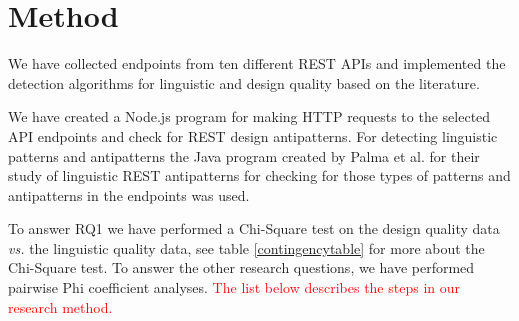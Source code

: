 \section{Method}\label{sec:Method}

We have collected endpoints from ten different REST APIs and implemented the detection algorithms for linguistic and design quality based on the literature. 

We have created a Node.js program for making HTTP requests to the selected API endpoints and check for REST design antipatterns. For detecting linguistic patterns and antipatterns the Java program created by Palma et al. for their study of linguistic REST antipatterns \cite{linguistic} for checking for those types of patterns and antipatterns in the endpoints was used. 

To answer RQ1 we have performed a Chi-Square test on the design quality data \textit{vs.} the linguistic quality data, see table \ref{contingencytable} for more about the Chi-Square test. To answer the other research questions, we have performed pairwise Phi coefficient analyses. \textcolor{red}{The list below describes the steps in our research method.}

